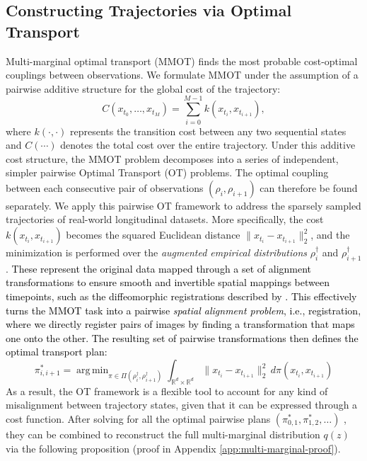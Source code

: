 \documentclass[twoside]{article}
\DeclareMathOperator*{\argmin}{arg\,min}
\begin{document}
\subsection{Constructing Trajectories via Optimal Transport}
\label{sec:mmot_coupling_unified}
Multi-marginal optimal transport (MMOT) finds the most probable cost-optimal couplings between observations. We formulate MMOT under the assumption of a pairwise additive structure for the global cost \citep{rohbeckmodeling} of the trajectory:
\begin{equation}
C(x_{t_0}, \ldots, x_{t_M}) = \sum_{i=0}^{M-1} k(x_{t_i},x_{t_{i+1}}),
\end{equation}
where $k(\cdot,\cdot)$ represents the transition cost between any two sequential states and $C(\cdots)$ denotes the total cost over the entire trajectory. Under this additive cost structure, the MMOT problem decomposes into a series of independent, simpler pairwise Optimal Transport (OT) problems. The optimal coupling between each consecutive pair of observations $(\rho_i, \rho_{i+1})$ can therefore be found separately. We apply this pairwise OT framework to address the sparsely sampled trajectories of real-world longitudinal datasets. More specifically, the cost $k(x_{t_i}, x_{t_{i+1}})$ becomes the squared Euclidean distance $\|x_{t_i} - x_{t_{i+1}}\|_2^2$, and the minimization is performed over the \emph{augmented empirical distributions} $\rho_i^{\dagger}$ and $\rho_{i+1}^{\dagger}$.
\textcolor{black}{These represent the original data mapped through a set of alignment transformations to ensure smooth and invertible spatial mappings between timepoints, such as the diffeomorphic registrations described by \citep{Mok_2020_CVPR}. This effectively turns the MMOT task into a pairwise \emph{spatial alignment problem}, i.e., registration, where we directly register pairs of images by finding a transformation that maps one onto the other. The resulting set of pairwise transformations then defines the optimal transport plan:}
\begin{equation}
\pi_{i,i+1}^{*} = \argmin_{\pi \in \Pi(\rho_i^{\dagger}, \rho_{i+1}^{\dagger})} \int_{\mathbb{R}^d \times \mathbb{R}^d} \|x_{t_i} - x_{t_{i+1}}\|_2^2 \, d\pi(x_{t_i},x_{t_{i+1}})
\end{equation}
As a result, the OT framework is a flexible tool to account for any kind of misalignment between trajectory states, given that it can be expressed through a cost function.
After solving for all the optimal pairwise plans $(\pi_{0,1}^{*}, \pi_{1,2}^{*}, \ldots)$ \citep{zhou2024efficient}, they can be combined to reconstruct the full multi-marginal distribution $q(z)$ via the following proposition (proof in Appendix \ref{app:multi-marginal-proof}).
\end{document}
